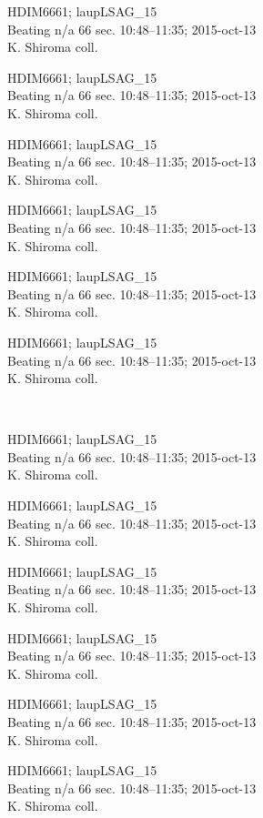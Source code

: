 \documentclass[2pt]{extarticle}
\begin{document}
\noindent
\parbox{0.16\textwidth}{\tiny \raggedright \rule[-0.3\baselineskip]{0pt}{10pt}HDIM6661; laupLSAG\_15\\ Beating n/a 66 sec. 10:48--11:35; 2015-oct-13\\ K. Shiroma coll.}
\parbox{0.16\textwidth}{\tiny \raggedright \rule[-0.3\baselineskip]{0pt}{10pt}HDIM6661; laupLSAG\_15\\ Beating n/a 66 sec. 10:48--11:35; 2015-oct-13\\ K. Shiroma coll.}
\parbox{0.16\textwidth}{\tiny \raggedright \rule[-0.3\baselineskip]{0pt}{10pt}HDIM6661; laupLSAG\_15\\ Beating n/a 66 sec. 10:48--11:35; 2015-oct-13\\ K. Shiroma coll.}
\parbox{0.16\textwidth}{\tiny \raggedright \rule[-0.3\baselineskip]{0pt}{10pt}HDIM6661; laupLSAG\_15\\ Beating n/a 66 sec. 10:48--11:35; 2015-oct-13\\ K. Shiroma coll.}
\parbox{0.16\textwidth}{\tiny \raggedright \rule[-0.3\baselineskip]{0pt}{10pt}HDIM6661; laupLSAG\_15\\ Beating n/a 66 sec. 10:48--11:35; 2015-oct-13\\ K. Shiroma coll.}
\parbox{0.16\textwidth}{\tiny \raggedright \rule[-0.3\baselineskip]{0pt}{10pt}HDIM6661; laupLSAG\_15\\ Beating n/a 66 sec. 10:48--11:35; 2015-oct-13\\ K. Shiroma coll.} \\ 
\vspace{0.001in} 

\noindent
\parbox{0.16\textwidth}{\tiny \raggedright \rule[-0.3\baselineskip]{0pt}{10pt}HDIM6661; laupLSAG\_15\\ Beating n/a 66 sec. 10:48--11:35; 2015-oct-13\\ K. Shiroma coll.}
\parbox{0.16\textwidth}{\tiny \raggedright \rule[-0.3\baselineskip]{0pt}{10pt}HDIM6661; laupLSAG\_15\\ Beating n/a 66 sec. 10:48--11:35; 2015-oct-13\\ K. Shiroma coll.}
\parbox{0.16\textwidth}{\tiny \raggedright \rule[-0.3\baselineskip]{0pt}{10pt}HDIM6661; laupLSAG\_15\\ Beating n/a 66 sec. 10:48--11:35; 2015-oct-13\\ K. Shiroma coll.}
\parbox{0.16\textwidth}{\tiny \raggedright \rule[-0.3\baselineskip]{0pt}{10pt}HDIM6661; laupLSAG\_15\\ Beating n/a 66 sec. 10:48--11:35; 2015-oct-13\\ K. Shiroma coll.}
\parbox{0.16\textwidth}{\tiny \raggedright \rule[-0.3\baselineskip]{0pt}{10pt}HDIM6661; laupLSAG\_15\\ Beating n/a 66 sec. 10:48--11:35; 2015-oct-13\\ K. Shiroma coll.}
\parbox{0.16\textwidth}{\tiny \raggedright \rule[-0.3\baselineskip]{0pt}{10pt}HDIM6661; laupLSAG\_15\\ Beating n/a 66 sec. 10:48--11:35; 2015-oct-13\\ K. Shiroma coll.} \\ 
\vspace{0.001in} 
\end{document}
